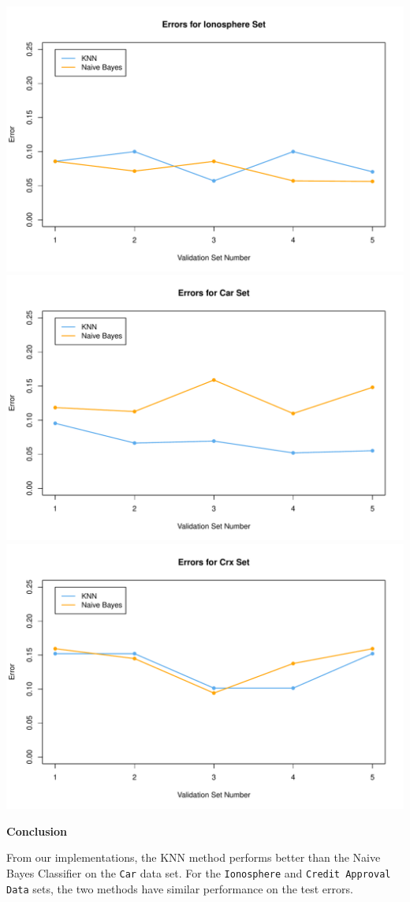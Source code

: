\documentclass{article}
\newcommand{\code}[1]{\texttt{#1}}
\begin{document}
\begin{center}
    \includegraphics[width=0.75\linewidth]{Images/Prob4/Prob4-Iono.pdf}
    \includegraphics[width=0.75\linewidth]{Images/Prob4/Prob4-Car.pdf}
    \includegraphics[width=0.75\linewidth]{Images/Prob4/Prob4-Crx.pdf}
\end{center}
\bigskip



\noindent\textbf{Conclusion}
\bigskip

From our implementations, the KNN method performs better than the Naive Bayes Classifier on the \code{Car} data set.
For the \code{Ionosphere} and \code{Credit Approval Data} sets, the two methods have similar performance on the test errors.
\bigskip
\end{document}
